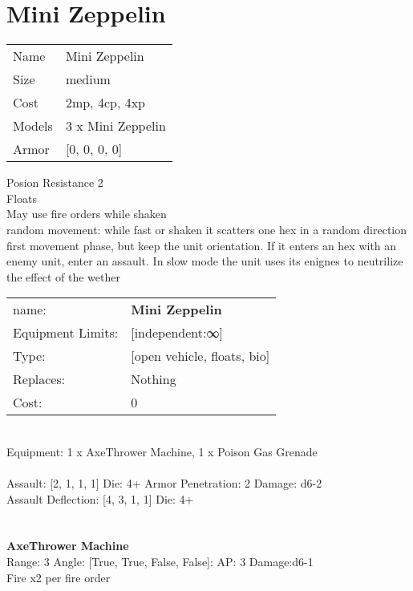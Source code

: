 \pagebreak\pagebreak

\section{ Mini Zeppelin }

\begin{tabular}{ll}
  Name & Mini Zeppelin \\
  Size & medium\\
  Cost & 2mp, 4cp, 4xp\\
  Models & 3 x Mini Zeppelin\\
  Armor & [0, 0, 0, 0]\\
\end{tabular}

\noindent Posion Resistance 2\\ 
Floats\\ 
May use fire orders while shaken\\ 
random movement: while fast or shaken it scatters one hex in a random direction first movement phase, but keep the unit orientation. If it enters an hex with an enemy unit, enter an assault. In slow mode the unit uses its enignes to neutrilize the effect of the wether\\ 


\noindent
\begin{tabular}{ll}
name: &{\bf Mini Zeppelin } \\
Equipment Limits: &[independent:∞] \\
Type: &[open vehicle, floats, bio] \\
Replaces: &Nothing \\
Cost: & 0\\
\end{tabular}
\ \\
Equipment: 1 x AxeThrower Machine, 1 x Poison Gas Grenade \\
\ \\
Assault: [2, 1, 1, 1] Die: 4+ Armor Penetration: 2 Damage: d6-2 \\
Assault Deflection: [4, 3, 1, 1] Die: 4+\\
\indent  
\ \\

\ \\
{\bf AxeThrower Machine } \\



Range: 3  Angle: [True, True, False, False]: AP: 3 Damage:d6-1 \\
Fire x2 per fire order\\ 





